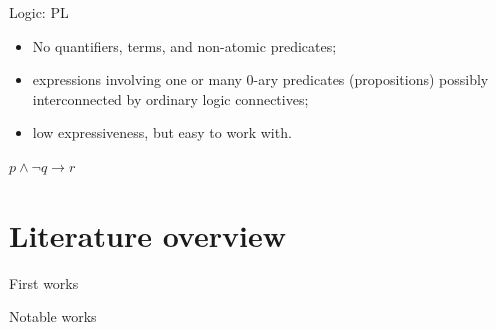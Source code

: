 \documentclass[presentation]{beamer}\mode<presentation>{\usetheme{AMSBolognaFC}}
\begin{document}
\begin{frame}[c]{Logic: PL}
    \begin{itemize}
        \item No quantifiers, terms, and non-atomic predicates;
        \item expressions involving one or many 0-ary predicates (propositions) possibly interconnected by ordinary logic connectives;
        \item low expressiveness, but easy to work with.
    \end{itemize}
    \vfill\centering
    $p \wedge \neg q \rightarrow r$
\end{frame}


\section{Literature overview}

\begin{frame}[c]{First works}
\end{frame}


\begin{frame}[c]{Notable works}
\end{frame}

\section{\psyki}
\end{document}
